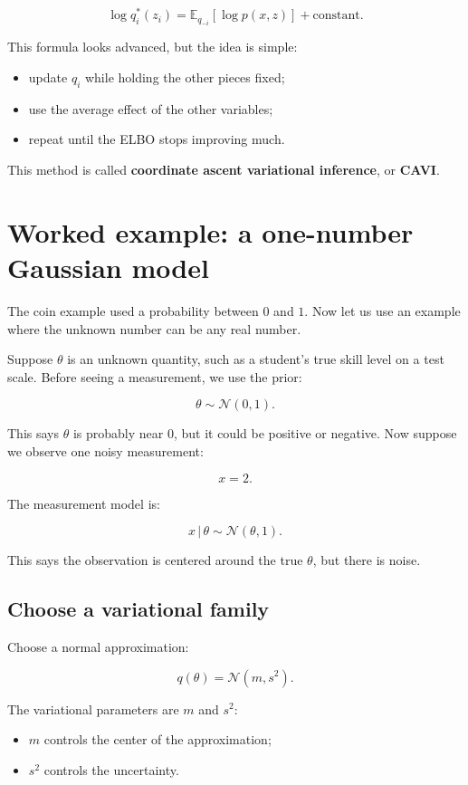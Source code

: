 \documentclass[11pt]{article}
\newcommand{\E}{\mathbb{E}}
\newcommand{\given}{\,|\,}
\begin{document}
\begin{equation}
\boxed{
\log q_i^*(z_i)
= \E_{q_{-i}}[\log p(x,z)] + \text{constant}.
}
\end{equation}

This formula looks advanced, but the idea is simple:

\begin{itemize}[leftmargin=*]
  \item update $q_i$ while holding the other pieces fixed;
  \item use the average effect of the other variables;
  \item repeat until the ELBO stops improving much.
\end{itemize}

This method is called \textbf{coordinate ascent variational inference}, or \textbf{CAVI}.

\section{Worked example: a one-number Gaussian model}

The coin example used a probability between $0$ and $1$.
Now let us use an example where the unknown number can be any real number.

Suppose $\theta$ is an unknown quantity, such as a student's true skill level on a test scale.
Before seeing a measurement, we use the prior:

\[
\theta \sim \mathcal{N}(0,1).
\]

This says $\theta$ is probably near $0$, but it could be positive or negative.
Now suppose we observe one noisy measurement:

\[
x = 2.
\]

The measurement model is:

\[
x \given \theta \sim \mathcal{N}(\theta,1).
\]

This says the observation is centered around the true $\theta$, but there is noise.

\subsection{Choose a variational family}

Choose a normal approximation:

\[
q(\theta) = \mathcal{N}(m,s^2).
\]

The variational parameters are $m$ and $s^2$:

\begin{itemize}[leftmargin=*]
  \item $m$ controls the center of the approximation;
  \item $s^2$ controls the uncertainty.
\end{itemize}
\end{document}
